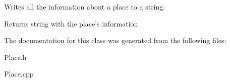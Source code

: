 Writes all the information about a place to a string. 

\begin{DoxyReturn}{Returns}
string with the place's information 
\end{DoxyReturn}


The documentation for this class was generated from the following files\+:\begin{DoxyCompactItemize}
\item 
Place.\+h\item 
Place.\+cpp\end{DoxyCompactItemize}
